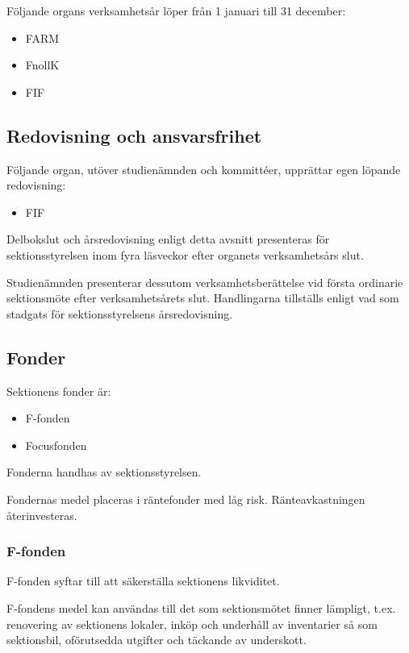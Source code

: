 \documentclass{styrdokument}
\begin{document}
\? Följande organs verksamhetsår löper från 1 januari till 31 december:
\begin{itemize}
    \item FARM
    \item FnollK
    \item FIF
\end{itemize} 

\subsection{Redovisning och ansvarsfrihet}
\? Följande organ, utöver studienämnden och kommittéer, upprättar egen löpande redovisning:
\begin{itemize}
    \item FIF
\end{itemize}

\? Delbokslut och årsredovisning enligt detta avsnitt presenteras för sektionsstyrelsen inom fyra läsveckor efter organets verksamhetsårs slut.

\? Studienämnden presenterar dessutom verksamhetsberättelse vid första ordinarie sektionsmöte efter verksamhetsårets slut.
Handlingarna tillställs enligt vad som stadgats för sektionsstyrelsens årsredovisning.


\subsection{Fonder}
\? Sektionens fonder är:
\begin{itemize}
    \item F-fonden
    \item Focusfonden
\end{itemize}

\? Fonderna handhas av sektionsstyrelsen.

\? Fondernas medel placeras i räntefonder med låg risk.
Ränteavkastningen återinvesteras.

\subsubsection{F-fonden}
\? F-fonden syftar till att säkerställa sektionens likviditet.

\? F-fondens medel kan användas till det som sektionsmötet finner lämpligt, t.ex. renovering av sektionens lokaler, inköp och underhåll av inventarier så som sektionsbil, oförutsedda utgifter och täckande av underskott.
\end{document}
